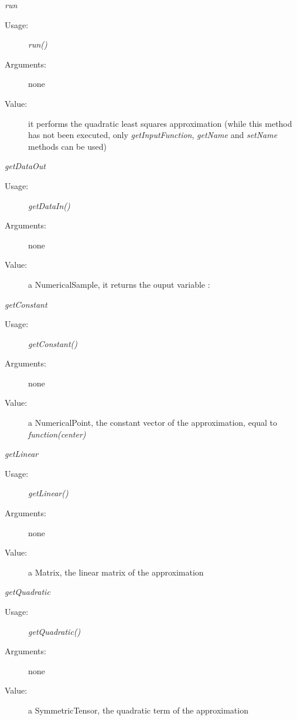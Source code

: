 \begin{description}
\begin{description}
\item \textit{run}
\begin{description}
\item[Usage:] \textit{run()}
\item[Arguments:] none
\item[Value:] it performs the quadratic least squares approximation
(while this method has not been executed, only
\textit{getInputFunction}, \textit{getName} and \textit{setName} methods can be used)
\end{description}
\bigskip

\item \textit{getDataOut}
\begin{description}
\item[Usage:] \textit{getDataIn()}
\item[Arguments:] none
\item[Value:] a NumericalSample, it returns the ouput variable :
\end{description}
\bigskip

\item \textit{getConstant}
\begin{description}
\item[Usage:] \textit{getConstant()}
\item[Arguments:] none
\item[Value:] a NumericalPoint, the constant vector of the approximation, equal to \textit{function(center)}
\end{description}
\bigskip

\item \textit{getLinear}
\begin{description}
\item[Usage:] \textit{getLinear()}
\item[Arguments:] none
\item[Value:] a Matrix, the linear matrix of the approximation
\end{description}
\bigskip


\item \textit{getQuadratic}
\begin{description}
\item[Usage:] \textit{getQuadratic()}
\item[Arguments:] none
\item[Value:] a SymmetricTensor, the quadratic term of the approximation
\end{description}


\end{description}
\end{description}
